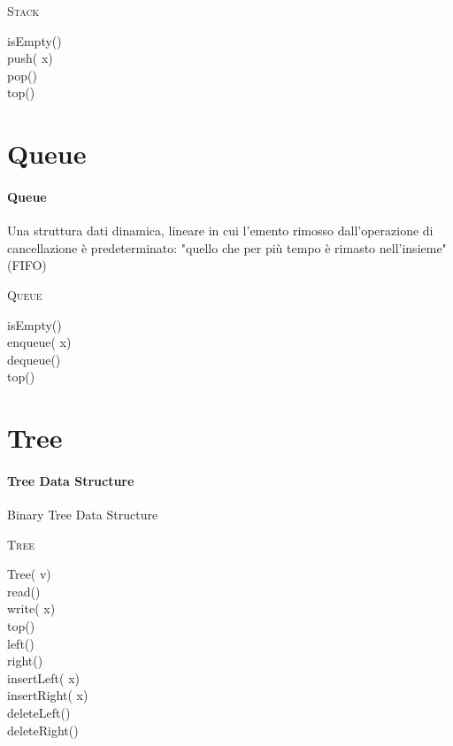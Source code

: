 \documentclass[../../notes.tex]{subfiles}
\begin{document}
  \begin{algorithm}[H]
    \NoCaptionOfAlgo
    \caption{\textsc{Stack}}

     isEmpty()\\
    push( x)\\
     pop()\\
     top()\\
  \end{algorithm}

  \section{Queue}
  \paragraph{Queue} Una struttura dati dinamica, lineare in cui l'emento rimosso dall'operazione di cancellazione è predeterminato: "quello che per più tempo è rimasto nell'insieme" (FIFO)

  \begin{algorithm}[H]
    \NoCaptionOfAlgo
    \caption{\textsc{Queue}}

     isEmpty()\\
    enqueue( x)\\
     dequeue()\\
     top()\\
  \end{algorithm}


  \section{Tree}
  \paragraph{Tree Data Structure} Binary Tree Data Structure

  \begin{algorithm}[H]
    \NoCaptionOfAlgo
    \caption{\textsc{Tree}}

    Tree( v)\\
     read()\\
    write( x)\\
     top()\\
     left()\\
     right()\\

    insertLeft( x)\\
    insertRight( x)\\

    deleteLeft()\\
    deleteRight()\\
  \end{algorithm}
\end{document}

